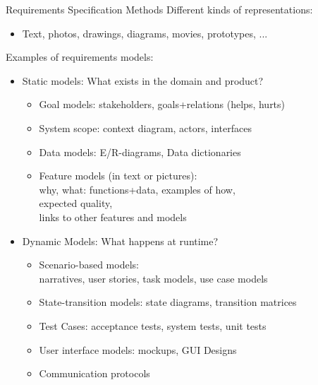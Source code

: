 \documentclass{simpleslides}
\begin{document}
\begin{frame}[fragile]{Requirements Specification Methods}
Different kinds of representations:
\begin{itemize}
\item Text, photos, drawings, diagrams, movies, prototypes, ...
\end{itemize}
Examples of requirements models:
\begin{itemize}
\item Static models: What exists in the domain and product?
\begin{itemize}
\item Goal models: stakeholders, goals+relations (helps, hurts)
\item System scope: context diagram, actors, interfaces
\item Data models: E/R-diagrams, Data dictionaries
\item Feature models (in text or pictures):\\why, what: functions+data, examples of how,\\expected quality,\\links to other features and models
\end{itemize}
\item Dynamic Models: What happens at runtime?
\begin{itemize}
\item Scenario-based models:\\narratives, user stories, task models, use case models
\item State-transition models: state diagrams, transition matrices
\item Test Cases: acceptance tests, system tests, unit tests
\item User interface models: mockups, GUI Designs
\item Communication protocols
\end{itemize}
\end{itemize}
\end{frame}
\end{document}
